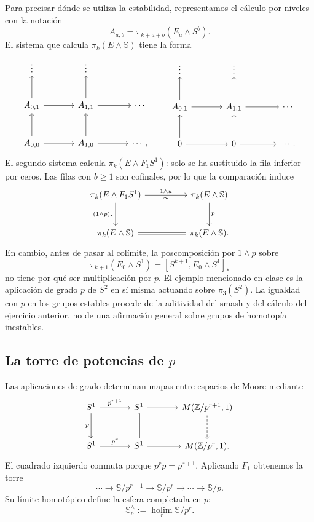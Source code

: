 Para precisar dónde se utiliza la estabilidad, representamos el cálculo por niveles con la notación
\[
A_{a,b}=\pi_{k+a+b}(E_a\wedge S^b).
\]
El sistema que calcula $\pi_k(E\wedge\mathbb S)$ tiene la forma
\[
\begin{tikzcd}[column sep=large,row sep=large]
\vdots&\vdots&\\
A_{0,1}\arrow[u]\arrow[r]&A_{1,1}\arrow[u]\arrow[r]&\cdots\\
A_{0,0}\arrow[u]\arrow[r]&A_{1,0}\arrow[u]\arrow[r]&\cdots,
\end{tikzcd}
\qquad
\begin{tikzcd}[column sep=large,row sep=large]
\vdots&\vdots&\\
A_{0,1}\arrow[u]\arrow[r]&A_{1,1}\arrow[u]\arrow[r]&\cdots\\
0\arrow[u]\arrow[r]&0\arrow[u]\arrow[r]&\cdots.
\end{tikzcd}
\]
El segundo sistema calcula $\pi_k(E\wedge F_1S^1)$: solo se ha sustituido la fila inferior por ceros. Las filas con $b\geq1$ son cofinales, por lo que la comparación induce
\[
\begin{tikzcd}[column sep=huge,row sep=large]
\pi_k(E\wedge F_1S^1)\arrow[r,"1\wedge u","\simeq"']\arrow[d,"(1\wedge p)_*"']
&\pi_k(E\wedge\mathbb S)\arrow[d,"p"]\\
\pi_k(E\wedge\mathbb S)\arrow[r,equal]&\pi_k(E\wedge\mathbb S).
\end{tikzcd}
\]
En cambio, antes de pasar al colímite, la poscomposición por $1\wedge p$ sobre
\[
\pi_{k+1}(E_0\wedge S^1)=[S^{k+1},E_0\wedge S^1]_*
\]
no tiene por qué ser multiplicación por $p$. El ejemplo mencionado en clase es la aplicación de grado $p$ de $S^2$ en sí misma actuando sobre $\pi_3(S^2)$. La igualdad con $p$ en los grupos estables procede de la aditividad del smash y del cálculo del ejercicio anterior, no de una afirmación general sobre grupos de homotopía inestables.

\subsection{La torre de potencias de \texorpdfstring{$p$}{p}}
Las aplicaciones de grado determinan mapas entre espacios de Moore mediante
\[
\begin{tikzcd}[column sep=large,row sep=large]
S^1\arrow[r,"p^{r+1}"]\arrow[d,"p"']&S^1\arrow[r]\arrow[d,equal]
&M(\mathbb Z/p^{r+1},1)\arrow[d,dashed]\\
S^1\arrow[r,"p^r"]&S^1\arrow[r]&M(\mathbb Z/p^r,1).
\end{tikzcd}
\]
El cuadrado izquierdo conmuta porque $p^rp=p^{r+1}$. Aplicando $F_1$ obtenemos la torre
\[
\cdots\longrightarrow\mathbb S/p^{r+1}\longrightarrow\mathbb S/p^r
\longrightarrow\cdots\longrightarrow\mathbb S/p.
\]
Su límite homotópico define la esfera completada en $p$:
\[
\mathbb S_p^{\wedge}:=\operatorname*{holim}_r\mathbb S/p^r.
\]

